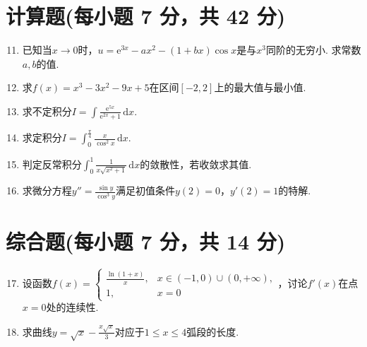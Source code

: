 \documentclass[../Main.tex]{subfiles}
\begin{document}
\section{计算题(每小题 7 分，共 42 分)}
\begin{enumerate}
    \setcounter{enumi}{10}
    \item 已知当$x\to0$时，$u=\mathrm{e}^{3x}-ax^{2}-(1+bx)\cos x$是与$x^{3}$同阶的无穷小.
          求常数$a,b$的值.
          \vspace{12em}

    \item 求$f(x)=x^{3}-3x^{2}-9x+5$在区间$[-2,2]$上的最大值与最小值.
          \vspace{12em}

    \item 求不定积分$I=\int \frac{\mathrm{e}^{5x}}{\mathrm{e}^{2x}+1}\,\mathrm{d}
              x$.
          \vspace{11em}

    \item 求定积分$I=\int_{0}^{\frac{\pi}{4}}\frac{x}{\cos^{2} x}\,\mathrm{d}x$.
          \vspace{11em}

    \item 判定反常积分$\int_{0}^{1}\frac{1}{x\sqrt{x^{2}+1}}\,\mathrm{d}x$的敛散性，若收敛求其值.
          \vspace{12em}

    \item 求微分方程$y''=\frac{\sin y}{\cos^{3} y}$满足初值条件$y(2)=0$，$y'
              (2)=1$的特解.
          \vspace{12em}
\end{enumerate}

\section{综合题(每小题 7 分，共 14 分)}
\begin{enumerate}
    \setcounter{enumi}{16}
    \item 设函数$f(x)=
              \begin{cases}
                  \frac{\ln(1+x)}{x} , & x\in(-1,0)\cup(0,+\infty), \\
                  1,                   & x=0
              \end{cases}$，讨论$f'(x)$在点$x=0$处的连续性.
          \vspace{12em}

    \item 求曲线$y=\sqrt{x}-\frac{x\sqrt{x}}{3}$对应于$1\leq x\leq 4$弧段的长度.
          \vspace{15em}
\end{enumerate}
\end{document}
